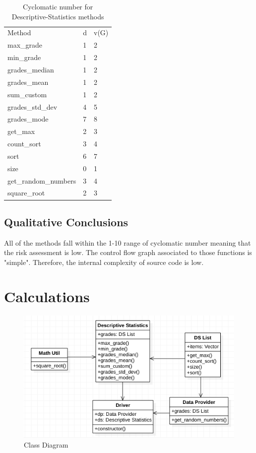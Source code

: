 \documentclass[11pt]{article}
\begin{document}
\begin{table}[ht!]
\centering
\begin{tabular}{lll}
Method           & d & v(G) \\
max\_grade       & 1 & 2    \\
min\_grade       & 1 & 2    \\
grades\_median   & 1 & 2    \\
grades\_mean     & 1 & 2    \\
sum\_custom      & 1 & 2    \\
grades\_std\_dev & 4 & 5    \\
grades\_mode     & 7 & 8    \\
get\_max         & 2 & 3    \\
count\_sort      & 3 & 4    \\
sort             & 6 & 7    \\
size             & 0 & 1    \\
get\_random\_numbers & 3 & 4    \\
square\_root     & 2 & 3   
\end{tabular}
\caption{Cyclomatic number for Descriptive-Statistics methods}
\end{table}

\newpage

\subsection{Qualitative Conclusions}

All of the methods fall within the 1-10 range of cyclomatic number meaning that the risk assessment is low. The control flow graph associated to those functions is "simple". Therefore, the internal complexity of source code is low.

\newpage

\section{Calculations}

\begin{figure}[h!]
	\centering
		\includegraphics[width=\textwidth]{classdiagram.png}
	\caption{Class Diagram}
	\label{fig:classdiagram}
\end{figure}
\end{document}
